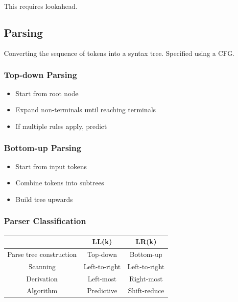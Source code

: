 \documentclass{article}
\begin{document}
This requires lookahead.


\subsection{Parsing}

Converting the sequence of tokens into a syntax tree.  
Specified using a CFG.

\subsubsection{Top-down Parsing}
\begin{itemize}
  \item Start from root node
  \item Expand non-terminals until reaching terminals
  \item If multiple rules apply, predict
\end{itemize}

\subsubsection{Bottom-up Parsing}
\begin{itemize}
  \item Start from input tokens
  \item Combine tokens into subtrees
  \item Build tree upwards
\end{itemize}

\subsubsection{Parser Classification}

\begin{center}
\begin{tabular}{|c|c|c|}
  \hline
   & LL(k) & LR(k) \\
  \hline
  Parse tree construction & Top-down & Bottom-up \\
  \hline
  Scanning & Left-to-right & Left-to-right \\
  \hline
  Derivation & Left-most & Right-most \\
  \hline
  Algorithm & Predictive & Shift-reduce \\
  \hline
\end{tabular}
\end{center}
\end{document}
